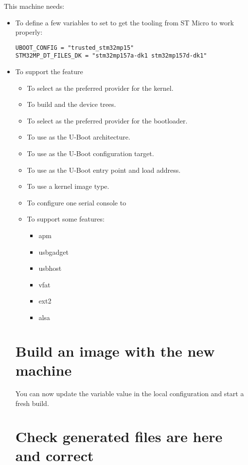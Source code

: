 This  machine needs:

\if{}
\begin{itemize}
  \item To define a few variables to set to get the tooling from ST
    Micro to work properly:
\begin{verbatim}
UBOOT_CONFIG = "trusted_stm32mp15"
STM32MP_DT_FILES_DK = "stm32mp157a-dk1 stm32mp157d-dk1"
\end{verbatim}
  \item To support the  feature
\else
\begin{itemize}
  \item To select  as the preferred provider
    for the kernel.
  \item To build  and the
     device trees.
  \item To select  as the preferred provider
    for the bootloader.
  \item To use  as the U-Boot architecture.
  \item To use  as the U-Boot
    configuration target.
  \item To use  as the U-Boot entry point and load
    address.
  \item To use a  kernel image type.
  \item To configure one serial console to 
  \item To support some features:
    \begin{itemize}
      \item apm
      \item usbgadget
      \item usbhost
      \item vfat
      \item ext2
      \item alsa
    \end{itemize}
\fi
\end{itemize}
\section{Build an image with the new machine}

You can now update the  variable value in the local configuration
and start a fresh build.

\section{Check generated files are here and correct}


\end{itemize}
